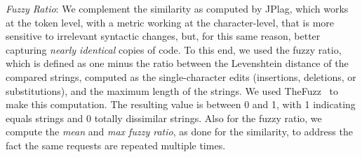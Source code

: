    \emph{Fuzzy Ratio}: We complement the similarity as computed by JPlag, which works at the token level, with a metric working at the character-level, that is more sensitive to irrelevant syntactic changes, but, for this same reason, better capturing \emph{nearly identical} copies of code. To this end, we used the fuzzy ratio, which is defined as one minus the ratio between the Levenshtein distance of the compared strings, computed as the single-character edits (insertions, deletions, or substitutions), and the maximum length of the strings. We used TheFuzz~\cite{fuzzy} to make this computation. The resulting value is between 0 and 1, with 1 indicating equals strings and $0$ totally dissimilar strings. Also for the fuzzy ratio, we compute the \emph{mean} and \emph{max fuzzy ratio}, as done for the similarity, to address the fact the same requests are repeated multiple times. 
    



\smallskip 

